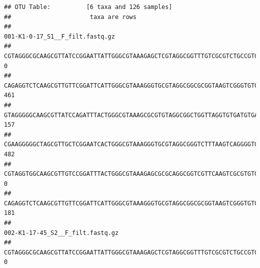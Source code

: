 \documentclass[]{article}
\begin{document}
\begin{verbatim}
## OTU Table:          [6 taxa and 126 samples]
##                      taxa are rows
##                                                                                                                                                                                                                                                           001-K1-0-17_S1__F_filt.fastq.gz
## CGTAGGGCGCAAGCGTTATCCGGAATTATTGGGCGTAAAGAGCTCGTAGGCGGTTTGTCGCGTCTGCCGTGAAAGTCCGGGGCTCAACTCCGGATCTGCGGTGGGTACGGGCAGACTAGAGTGATGTAGGGGAGACTGGAATTCCTGGTGTAGCGGTGAAATGCGCAGATATCAGGAGGAACACCGATGGCGAAGGCAGGTCTCTGGGCATTAACTGACGCTGAGGAGCGAAAGCATGGGGAGCGAACA                               0
## CAGAGGTCTCAAGCGTTGTTCGGATTCATTGGGCGTAAAGGGTGCGTAGGCGGCGCGGTAAGTCGGGTGTGAAATCTCGGAGCTTAACTCCGAAACTGCATTCGATACTGCCGTGCTTGAGGACTGGAGAGGAGACTGGAATTTACGGTGTAGCGGTGAAATGCGTAGATATCGTAAGGAAGACCAGTGGCGAAGGCGGGTCTCTGGACAGTTCCTGACGCTGAGGCACGAAGGCCAGGGGAGCAAACG                             461
## GTAGGGGGCAAGCGTTATCCAGATTTACTGGGCGTAAAGCGCGTGTAGGCGGCTGGTTAGGTGTGATGTGAAATCTTCCGGCTCAACCGGAAAACTGCATTGCAAACCGGCCTGGCTAGAGTGCAGGAGAGGGAAGCGGAATTCCAGGTGTAGCGGTGAAATGCGTAGATATCTGGAGGAACACCAGTGGCGAAGGCGGCTTCCTGGCCTGCAACTGACGCTGAGACGCGAAAGCGTGGGGAGCGAAC                              157
## CGAAGGGGGCTAGCGTTGCTCGGAATCACTGGGCGTAAAGGGTGCGTAGGCGGGTCTTTAAGTCAGGGGTGAAATCCTGGAGCTCAACTCCAGAACTGCCTTTGATACTGAAGATCTTGAGTTCGGGAGAGGTGAGTGGAACTGCGAGTGTAGAGGTGAAATTCGTAGATATTCGCAAGAACACCAGTGGCGAAGGCGGCTCACTGGCCCGATACTGACGCTGAGGCACGAAAGCGTGGGGAGCAAACA                             482
## CGTAGGTGGCAAGCGTTGTCCGGATTTACTGGGCGTAAAGAGCGCGCAGGCGGTCGTTCAAGTCGCGTGTGAAAGCCCCCGGCTCAACTGGGGAGGGTCACGCGATACTGATCGACTCGAAGGCAGGAGAGGGTAGTGGAATTCCCGGTGTAGTGGTGAAATGCGTAGATATCGGGAGGAACACCAGTGGCGAAGGCGACTACCTGGCCTGTTCTTGACGCTGAGGCGCGAAAGCTAGGGGAGCAAACG                               0
## CAGAGGTCTCAAGCGTTGTTCGGATTCATTGGGCGTAAAGGGTGCGTAGGCGGCGCGGTAAGTCGGGTGTGAAATCTCGGGGCTTAACTCCGAAACTGCATTCGATACTGCCGTGCTTGAGGACTGGAGAGGAGACTGGAATTTACGGTGTAGCGGTGAAATGCGTAGATATCGTAAGGAAGACCAGTGGCGAAGGCGGGTCTCTGGACAGTTCCTGACGCTGAGGCACGAAGGCCAGGGGAGCAAACG                             181
##                                                                                                                                                                                                                                                           002-K1-17-45_S2__F_filt.fastq.gz
## CGTAGGGCGCAAGCGTTATCCGGAATTATTGGGCGTAAAGAGCTCGTAGGCGGTTTGTCGCGTCTGCCGTGAAAGTCCGGGGCTCAACTCCGGATCTGCGGTGGGTACGGGCAGACTAGAGTGATGTAGGGGAGACTGGAATTCCTGGTGTAGCGGTGAAATGCGCAGATATCAGGAGGAACACCGATGGCGAAGGCAGGTCTCTGGGCATTAACTGACGCTGAGGAGCGAAAGCATGGGGAGCGAACA                                0

\end{verbatim}
\end{document}
